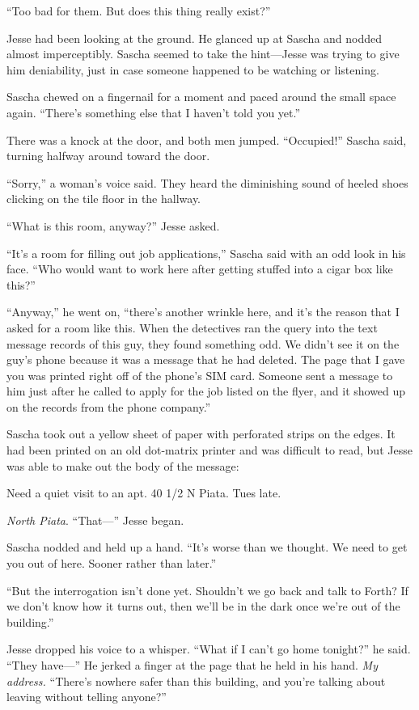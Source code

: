 \documentclass[12pt]{book}
\begin{document}
``Too bad for them.  But does this thing really exist?''

Jesse had been looking at the ground.  He glanced up at Sascha and nodded almost imperceptibly.  Sascha seemed to take the hint---Jesse was trying to give him deniability, just in case someone happened to be watching or listening.

Sascha chewed on a fingernail for a moment and paced around the small space again.  ``There's something else that I haven't told you yet.''

There was a knock at the door, and both men jumped.  ``Occupied!'' Sascha said, turning halfway around toward the door.

``Sorry,'' a woman's voice said.  They heard the diminishing sound of heeled shoes clicking on the tile floor in the hallway.

``What is this room, anyway?'' Jesse asked.

``It's a room for filling out job applications,'' Sascha said with an odd look in his face.  ``Who would want to work here after getting stuffed into a cigar box like this?''

``Anyway,'' he went on, ``there's another wrinkle here, and it's the reason that I asked for a room like this.  When the detectives ran the query into the text message records of this guy, they found something odd.  We didn't see it on the guy's phone because it was a message that he had deleted.  The page that I gave you was printed right off of the phone's SIM card.  Someone sent a message to him just after he called to apply for the job listed on the flyer, and it showed up on the records from the phone company.''

Sascha took out a yellow sheet of paper with perforated strips on the edges.  It had been printed on an old dot-matrix printer and was difficult to read, but Jesse was able to make out the body of the message:

\indent Need a quiet visit to an apt. 40 1/2 N Piata. Tues late.
	
\emph{North Piata}.  ``That---'' Jesse began.

Sascha nodded and held up a hand.  ``It's worse than we thought.  We need to get you out of here.  Sooner rather than later.''

``But the interrogation isn't done yet.  Shouldn't we go back and talk to Forth?  If we don't know how it turns out, then we'll be in the dark once we're out of the building.''

Jesse dropped his voice to a whisper.  ``What if I can't go home tonight?'' he said.  ``They have---''  He jerked a finger at the page that he held in his hand.  \emph{My address.}  ``There's nowhere safer than this building, and you're talking about leaving without telling anyone?''
\end{document}
